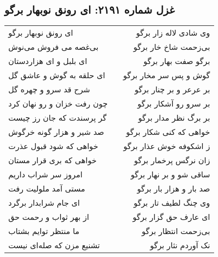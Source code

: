 \begin{center}
\section*{غزل شماره ۲۱۹۱: ای رونق نوبهار برگو}
\label{sec:2191}
\begin{longtable}{l p{0.5cm} r}
ای رونق نوبهار برگو
&&
وی شادی لاله زار برگو
\\
بی‌غصه می فروش می‌نوش
&&
بی‌زحمت شاخ خار برگو
\\
ای بلبل و ای هزاردستان
&&
برگو صفت بهار برگو
\\
ای حلقه به گوش و عاشق گل
&&
گوش و پس سر مخار برگو
\\
شرح قد سرو و چهره گل
&&
بر عرعر و بر چنار برگو
\\
چون رفت خزان و رو نهان کرد
&&
بر سرو رو آشکار برگو
\\
گر پرسندت که جان رز چیست
&&
بر برگ نظر مدار برگو
\\
صد شیر و هزار گونه خرگوش
&&
خواهی که کنی شکار برگو
\\
خواهی که شود قبول عذرت
&&
ز اشکوفه خوش عذار برگو
\\
خواهی که بری قرار مستان
&&
زان نرگس پرخمار برگو
\\
امروز سر شراب داریم
&&
ساقی شو و بر نهار برگو
\\
مستی آمد ملولیت رفت
&&
صد بار و هزار بار برگو
\\
ای جام شرابدار برگرد
&&
وی چنگ لطیف تار برگو
\\
از بهر ثواب و رحمت حق
&&
ای عارف حق گزار برگو
\\
ما منتظر توایم بشتاب
&&
بی‌زحمت انتظار برگو
\\
تشنیع مزن که صله‌ای نیست
&&
نک آوردم نثار برگو
\\
\end{longtable}
\end{center}
